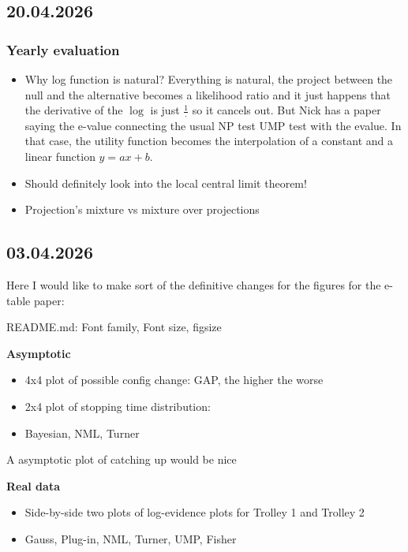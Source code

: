 \subsection*{20.04.2026}

\subsubsection*{Yearly evaluation}

\begin{itemize}
	\item Why log function is natural?
	Everything is natural, the project between the null and the alternative becomes a likelihood ratio 
	and it just happens that the derivative of the $\log$ is just $\frac{1}{\cdot}$ so it cancels out.
	But Nick has a paper saying the e-value connecting the usual NP test UMP test with the evalue.
	In that case, the utility function becomes the interpolation of a constant and a linear function $y=ax+b$.
	\item Should definitely look into the local central limit theorem!
	\item Projection's mixture vs mixture over projections
\end{itemize}

\subsection*{03.04.2026}

Here I would like to make sort of the definitive changes for the figures for the e-table paper:

README.md:
Font family, Font size, figsize

\textbf{Asymptotic}

\begin{itemize}
	\item 4x4 plot of possible config change: GAP, the higher the worse
	\item 2x4 plot of stopping time distribution:
	\item Bayesian, NML, Turner
\end{itemize}

A asymptotic plot of catching up would be nice

\textbf{Real data}
\begin{itemize}
	\item Side-by-side two plots of log-evidence plots for Trolley 1 and Trolley 2
	\item Gauss, Plug-in, NML, Turner, UMP, Fisher
\end{itemize}

